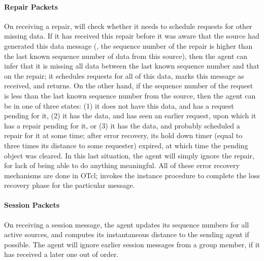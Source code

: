 \paragraph{Repair Packets}
On receiving a repair, 
will check whether it needs to schedule requests for other missing data.
If it has received this repair
before it was aware that the source had generated this data message
(\ie, the sequence number of the repair is higher than 
the last known sequence number of data from this source),
then the agent can infer that it is missing all
data between the last known sequence number and that on the repair;
it schedules requests for all of this data,
 marks this message as received, and returns.
On the other hand, if the sequence number of the request is less
than the last known sequence number from the source,
then the agent can be in one of three states:
(1) it does not have this data, and has a request pending for it,
(2) it has the data, and has seen an earlier request,
    upon which it has a repair pending for it, or
(3) it has the data, and probably scheduled a repair for it at some time;
    after error recovery, its hold down timer (equal to three times its
    distance to some requester) expired, at which time the pending object
    was cleared.  In this last situation, the agent will simply ignore
    the repair, for lack of being able to do anything meaningful.
All of these error recovery mechanisms are done in OTcl;
 invokes the instance procedure
to complete the loss recovery phase for the particular message.
  
\paragraph{Session Packets}
On receiving a session message,
the agent updates its sequence numbers for all active sources,
and computes its instantaneous distance to the sending agent if possible.
The agent will ignore earlier session messages from a group member,
if it has received a later one out of order.
  
